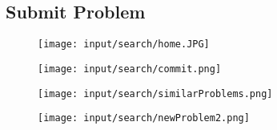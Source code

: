 \subsection{Submit Problem}

\begin{frame}
\begin{figure}[htbp]
\begin{center}
\texttt{[image: input/search/home.JPG]}
\end{center}
\end{figure}

\end{frame}

\begin{frame}

\begin{figure}[htbp]
\begin{center}
\texttt{[image: input/search/commit.png]}
\end{center}
\end{figure}

\end{frame}

\begin{frame}

\begin{figure}[htbp]
\begin{center}
\texttt{[image: input/search/similarProblems.png]}
\end{center}
\end{figure}

\end{frame}

\begin{frame}

\begin{figure}[htbp]
\begin{center}
\texttt{[image: input/search/newProblem2.png]}
\end{center}
\end{figure}

\end{frame}

\newcommand{\tagone}{Computer}
\newcommand{\tagtwo}{BSOD}
